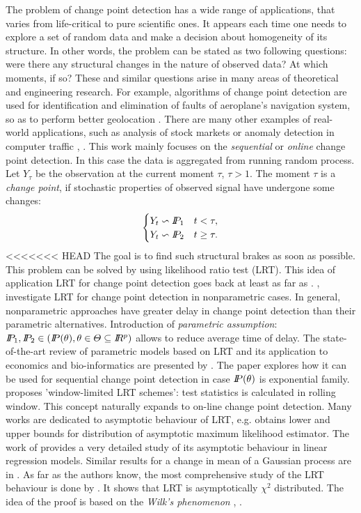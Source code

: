 The problem of change point detection has a wide range of applications, that varies from life-critical to pure scientific ones. It appears each time one needs to explore a set of random data and make a decision about homogeneity of its structure. In other words, the problem can be stated as two following questions: were there any structural changes in the nature of observed data? At which moments, if so? These and similar questions arise in many areas of theoretical and engineering research. For example, algorithms of change point detection are used for identification and elimination of faults of aeroplane's navigation system, so as to perform better geolocation \citet{Nikif}. There are many other examples of real-world applications, such as analysis of stock markets \citet{Lavielle} or anomaly detection in computer traffic \citet{Tartak}, \citet{Casas}. This work mainly focuses on the \textit{sequential} or \textit{online} change point detection. In this case the data is aggregated from running random process. Let $Y_{\tau}$ be the observation at the current moment $\tau$, $\tau > 1$. 
The moment $\tau$ is a \textit{change point}, if stochastic properties of observed signal have undergone some changes: 
\[
\begin{cases}
Y_t \backsim \P_1 & t < \tau, \\ 
Y_t \backsim \P_2 & t \geq \tau. 
\end{cases} 
\]
<<<<<<< HEAD
The goal is to find such structural brakes as soon as possible. 
This problem can be solved by using likelihood ratio test (LRT). This idea of application LRT for change point detection  goes back at least as far as \citet{quandt1960tests}. \citet{liu2008empirical}, \citet{zou2007empirical} investigate LRT for change point detection in nonparametric cases. In general, nonparametric approaches have greater delay in change point detection than their parametric alternatives. Introduction of \textit{parametric assumption}: $\P_1, \P_2 \in (\P(\theta), \theta \in \Theta \subseteq \R^p)$ allows to reduce average time of delay. The state-of-the-art review of parametric models based on LRT and its application to economics and bio-informatics are presented by \citet{ParStatChen}.  The paper \citet{gombay2000sequential} explores how it can be used for sequential change point detection in case $\P(\theta)$ is exponential family. \citet{lai1995sequential} proposes 'window-limited LRT schemes': test statistics is calculated in rolling window. This concept naturally expands to on-line change point detection. Many works are dedicated to asymptotic behaviour of LRT, e.g. \citet{jandhyala1999capturing} obtains lower and upper bounds for distribution of asymptotic maximum likelihood estimator. The work of \citet{kim1994tests} provides a very detailed study of its asymptotic behaviour in linear regression models. Similar results for a change in mean of a Gaussian process are in \citet{fotopoulos2010exact}. As far as the authors know, the most comprehensive study of the LRT behaviour is done by \citet{LRTWilks}. It shows that LRT is asymptotically $\chi^2$ distributed. The idea of the proof is based on the \textit{Wilk's phenomenon} \citet{wilks1938large}, \citet{boucheron2011high}. 

